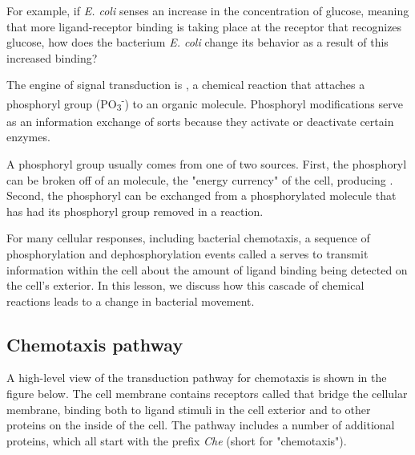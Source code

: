 For example, if \textit{E. coli} senses an increase in the concentration of glucose, meaning that more ligand-receptor binding is taking place at the receptor that recognizes glucose, how does the bacterium \textit{E. coli} change its behavior as a result of this increased binding?

The engine of signal transduction is , a chemical reaction that attaches a phosphoryl group (PO\textsubscript{3}\textsuperscript{-}) to an organic molecule.  Phosphoryl modifications serve as an information exchange of sorts because they activate or deactivate certain enzymes.

A phosphoryl group usually comes from one of two sources. First, the phosphoryl can be broken off of an  molecule, the "energy currency" of the cell, producing . Second, the phosphoryl can be exchanged from a phosphorylated molecule that has had its phosphoryl group removed in a  reaction.

For many cellular responses, including bacterial chemotaxis, a sequence of phosphorylation and dephosphorylation events called a  serves to transmit information within the cell about the amount of ligand binding being detected on the cell's exterior. In this lesson, we discuss how this cascade of chemical reactions leads to a change in bacterial movement.

\FloatBarrier
{}
{}
\subsection{Chemotaxis pathway}

A high-level view of the transduction pathway for chemotaxis is shown in the figure below. The cell membrane contains receptors called  that bridge the cellular membrane, binding both to ligand stimuli in the cell exterior and to other proteins on the inside of the cell. The pathway includes a number of additional proteins, which all start with the prefix \textit{Che} (short for "chemotaxis").

